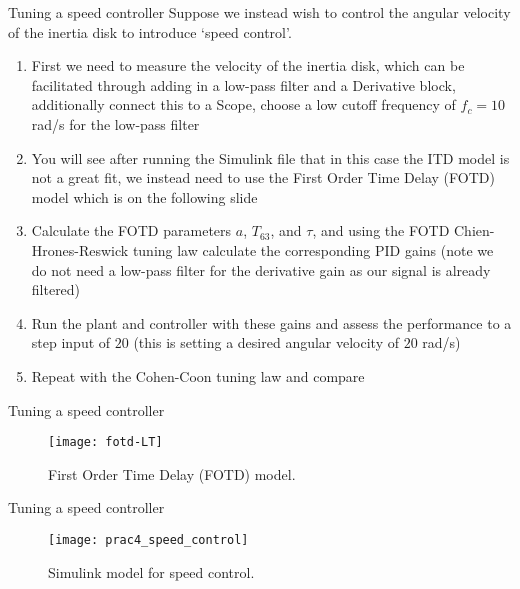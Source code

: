 \documentclass[9pt]{beamer-control}
\begin{document}

\begin{frame}{Tuning a speed controller}
Suppose we instead wish to control the angular velocity of the inertia disk to introduce `speed control'. 

\begin{enumerate}
	\item First we need to measure the velocity of the inertia disk, which can be facilitated through adding in a low-pass filter and a Derivative block, additionally connect this to a Scope, choose a low cutoff frequency of $f_c=10$ rad/s for the low-pass filter
	\item You will see after running the Simulink file that in this case the ITD model is not a great fit, we instead need to use the First Order Time Delay (FOTD) model which is on the following slide
	\item Calculate the FOTD parameters $a$, $T_{63}$, and $\tau$, and using the FOTD Chien-Hrones-Reswick tuning law calculate the corresponding PID gains (note we do not need a low-pass filter for the derivative gain as our signal is already filtered)
	\item Run the plant and controller with these gains and assess the performance to a step input of $20$ (this is setting a desired angular velocity of $20$ rad/s)
	\item Repeat with the Cohen-Coon tuning law and compare
\end{enumerate}

\end{frame}

\begin{frame}{Tuning a speed controller}
	\begin{figure}
	\centering
	\texttt{[image: fotd-LT]}
	\caption{First Order Time Delay (FOTD) model.}
\end{figure}
\end{frame}

\begin{frame}{Tuning a speed controller}
	\begin{figure}
		\centering
		\texttt{[image: prac4\_speed\_control]}
		\caption{Simulink model for speed control.}
	\end{figure}
\end{frame}
\end{document}
